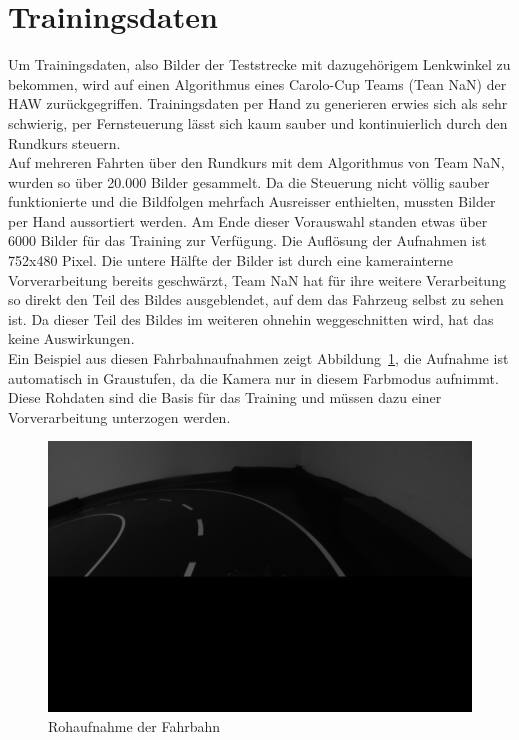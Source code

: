 \section{Trainingsdaten}
Um Trainingsdaten, also Bilder der Teststrecke mit dazugehörigem Lenkwinkel zu bekommen, wird auf einen Algorithmus eines Carolo-Cup Teams (Tean NaN) der HAW zurückgegriffen. Trainingsdaten per Hand zu generieren erwies sich als sehr schwierig, per Fernsteuerung lässt sich kaum sauber und kontinuierlich durch den Rundkurs steuern.\\
Auf mehreren Fahrten über den Rundkurs mit dem Algorithmus von Team NaN, wurden so über 20.000 Bilder gesammelt. Da die Steuerung nicht völlig sauber funktionierte und die Bildfolgen mehrfach Ausreisser enthielten, mussten Bilder per Hand aussortiert werden. Am Ende dieser Vorauswahl standen etwas über 6000 Bilder für das Training zur Verfügung. Die Auflösung der Aufnahmen ist 752x480 Pixel. Die untere Hälfte der Bilder ist durch eine kamerainterne Vorverarbeitung bereits geschwärzt, Team NaN hat für ihre weitere Verarbeitung so direkt den Teil des Bildes ausgeblendet, auf dem das Fahrzeug selbst zu sehen ist. Da dieser Teil des Bildes im weiteren ohnehin weggeschnitten wird, hat das keine Auswirkungen. \\
Ein Beispiel aus diesen Fahrbahnaufnahmen zeigt Abbildung~\ref{img:rohbild}, die Aufnahme ist automatisch in Graustufen, da die Kamera nur in diesem Farbmodus aufnimmt.
Diese Rohdaten sind die Basis für das Training und müssen dazu einer Vorverarbeitung unterzogen werden. 

\begin{figure}[h]
	\centering
	\includegraphics[scale=0.4]{figures/Rohbild.png}
	\caption{Rohaufnahme der Fahrbahn}
	\label{img:rohbild}
\end{figure}


